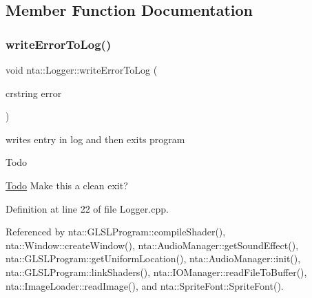 \subsection{Member Function Documentation}
\mbox{\label{classnta_1_1Logger_a08299f1414203eba74b306ce6712192e}} 
\subsubsection{\texorpdfstring{write\+Error\+To\+Log()}{writeErrorToLog()}}
{\footnotesize\ttfamily void nta\+::\+Logger\+::write\+Error\+To\+Log (\begin{DoxyParamCaption}\item[{crstring}]{error }\end{DoxyParamCaption})\hspace{0.3cm}{\ttfamily [static]}}



writes entry in log and then exits program 

\begin{DoxyRefDesc}{Todo}
\item[\hyperlink{todo__todo000006}{Todo}]Make this a clean exit? \end{DoxyRefDesc}


Definition at line 22 of file Logger.\+cpp.



Referenced by nta\+::\+G\+L\+S\+L\+Program\+::compile\+Shader(), nta\+::\+Window\+::create\+Window(), nta\+::\+Audio\+Manager\+::get\+Sound\+Effect(), nta\+::\+G\+L\+S\+L\+Program\+::get\+Uniform\+Location(), nta\+::\+Audio\+Manager\+::init(), nta\+::\+G\+L\+S\+L\+Program\+::link\+Shaders(), nta\+::\+I\+O\+Manager\+::read\+File\+To\+Buffer(), nta\+::\+Image\+Loader\+::read\+Image(), and nta\+::\+Sprite\+Font\+::\+Sprite\+Font().

